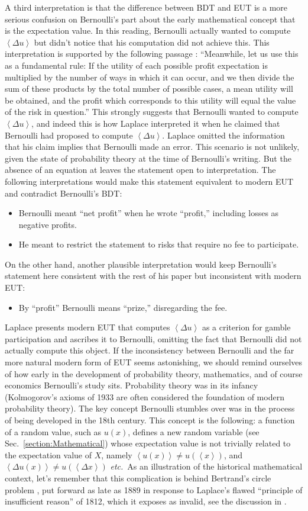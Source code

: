 \documentclass[pdftex]{article}
\newcommand{\etc}{{\it etc.}\ }
\newcommand{\ave}[1]{\left\langle#1 \right\rangle}
\newcommand{\bi}{\begin{itemize}}
\newcommand{\ei}{\end{itemize}}
\newcommand{\secref}[1]{Sec.~\ref{section:#1}}
\newcommand{\Dx}{{\Delta x}}
\newcommand{\Du}{\Delta u}
\begin{document}
A third interpretation is that the difference between BDT and EUT is a more serious confusion on Bernoulli's part about the early mathematical concept that is the expectation value. In this reading,  Bernoulli actually wanted to compute $\ave{\Du}$ but didn't notice that his computation did not achieve this. This interpretation is supported by the following passage \cite[p.~24]{Bernoulli1738}: ``Meanwhile, let us use this as a fundamental rule: If the utility of each possible profit expectation is multiplied by the number of ways in which it can occur, and we then divide the sum of these products by the total number of possible cases, a mean utility will be obtained, and the profit which corresponds to this utility will equal the value of the risk in question.'' This strongly suggests that Bernoulli wanted to compute $\ave{\Du}$, and indeed this is how Laplace interpreted it when he claimed that Bernoulli had proposed to compute $\ave{\Du}$. Laplace omitted the information that his claim implies that Bernoulli made an error. This scenario is not unlikely, given the state of probability theory at the time of Bernoulli's writing. But the absence of an equation at \cite[p.~24]{Bernoulli1738} leaves the statement open to interpretation. The following interpretations would make this statement equivalent to modern EUT and contradict Bernoulli's BDT: 
\bi
\item
Bernoulli meant ``net profit'' when he wrote ``profit,'' including losses as negative profits. 
\item
He meant to restrict the statement to risks that require no fee to participate.
\ei

On the other hand, another plausible interpretation would keep Bernoulli's statement here consistent with the rest of his paper but inconsistent with modern EUT:
\bi
\item
By ``profit'' Bernoulli means ``prize,'' disregarding the fee.
\ei

Laplace presents modern EUT that computes $\ave{\Du}$ as a criterion for gamble participation and ascribes it to Bernoulli, omitting the fact that Bernoulli did not actually compute this object. If the inconsistency between Bernoulli and the far more natural modern form of EUT seems astonishing, we should remind ourselves of how early in the development of probability theory, mathematics, and of course economics Bernoulli's study sits. Probability theory was in its infancy (Kolmogorov's axioms of 1933 \cite{Kolmogorov1933} are often considered the foundation of modern probability theory). The key concept Bernoulli stumbles over was in the process of being developed in the 18th century. This concept is the following:  a function of a random value, such as $u(x)$, defines a new random variable (see \secref{Mathematical}) whose expectation value is not trivially related to the expectation value of $X$, namely $\ave{u(x)}\neq u(\ave{x})$, and $\ave{\Du(x)}\neq u(\ave\Dx)$ \etc As an illustration of the historical mathematical context, let's remember that this complication is behind Bertrand's circle problem \cite{Bertrand1889}, put forward as late as 1889 in response to Laplace's flawed ``principle of insufficient reason'' of 1812, which it exposes as invalid, see the discussion in \cite[p.~20]{vanKampen2007}.
\end{document}
